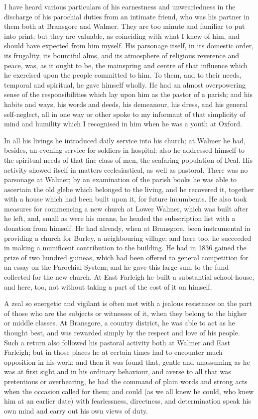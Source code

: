 I have heard various particulars of his
earnestness and unweariedness in the discharge of his parochial duties
from an intimate friend, who was his partner in them both at Bransgore
and Walmer. They are too minute and familiar to put into print; but
they are valuable, as coinciding with what I knew of him, and should
have expected from him myself. His parsonage itself, in its domestic
order, its frugality, its bountiful alms, and its atmosphere of
religious reverence and peace, was, as it ought to be, the mainspring
and centre of that influence which he exercised upon the people
committed to him. To them, and to their needs, temporal and spiritual,
he gave himself wholly. He had an almost overpowering sense of the
responsibilities which lay upon him as the pastor of a parish; and his
habits and ways, his words and deeds, his demeanour, his dress, and
his general self-neglect, all in one way or other spoke to my
informant of that simplicity of mind and humility which I
recognised in him when he was a youth at Oxford.

In all his livings he introduced daily service
into his church; at Walmer he had, besides, an evening service for
soldiers in hospital; also he addressed himself to the spiritual needs
of that fine class of men, the seafaring population of Deal. His
activity showed itself in matters ecclesiastical, as well as pastoral.
There was no parsonage at Walmer; by an examination of the parish
books he was able to ascertain the old glebe which belonged to the
living, and he recovered it, together with a house which had been
built upon it, for future incumbents. He also took measures for
commencing a new church at Lower Walmer, which was built after he
left, and, small as were his means, he headed the subscription list
with a donation from himself. He had already, when at Bransgore, been
instrumental in providing a church for Burley, a neighbouring village;
and here too, he succeeded in making a munificent contribution to the
building. He had in 1836 gained the prize of two hundred guineas,
which had been offered to general competition for an essay on the
Parochial System; and he gave this large sum to the fund collected for
the new church. At East Farleigh he built a substantial school-house,
and here, too, not without taking a part of the cost of it on himself.

A zeal so energetic and vigilant is often met
with a jealous resistance on the part of those who are the subjects or
witnesses of it, when they belong to the higher or middle classes. At
Bransgore, a country district, he was able to act as he thought best,
and was rewarded simply by the respect and love of his people.
Such a return also followed his pastoral activity both at Walmer and
East Farleigh; but in those places he at certain times had to
encounter much opposition in his work; and then it was found that,
gentle and unassuming as he was at first sight and in his ordinary
behaviour, and averse to all that was pretentious or overbearing, he
had the command of plain words and strong acts when the occasion
called for them; and could (as we all knew he could, who knew him at
an earlier date) with fearlessness, directness, and determination
speak his own mind and carry out his own views of duty.


